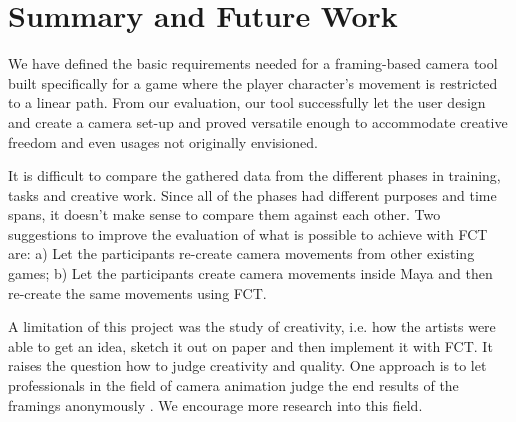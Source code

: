 \section{Summary and Future Work}
We have defined the basic requirements needed for a framing-based camera tool built specifically for a game where the player character's movement is restricted to a linear path. From our evaluation, our tool successfully let the user design and create a camera set-up and proved versatile enough to accommodate creative freedom and even usages not originally envisioned. 

It is difficult to compare the gathered data from the different phases in training, tasks and creative work. Since all of the phases had different purposes and time spans, it doesn't make sense to compare them against each other. Two suggestions to improve the evaluation of what is possible to achieve with FCT are: a) Let the participants re-create camera movements from other existing games; b) Let the participants create camera movements inside Maya and then re-create the same movements using FCT.

A limitation of this project was the study of creativity, i.e. how the artists were able to get an idea, sketch it out on paper and then implement it with FCT. It raises the question how to judge creativity and quality. One approach is to let professionals in the field of camera animation judge the end results of the framings anonymously \cite{sadeghi_artist_2010}. We encourage more research into this field.